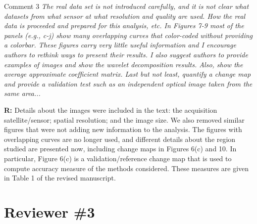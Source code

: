 \documentclass[11pt]{report}
\begin{document}

\vspace{0.3cm}


\medskip

\begin{mybox}{Comment 3}
\textit{The real data set is not introduced carefully, and it is not clear what datasets from what sensor at what resolution and
quality are used. How the real data is proceeded and prepared for this analysis, etc. In Figures 7-9 most of the panels
(e.g., c-j) show many overlapping curves that color-coded without providing a colorbar. These figures carry very little
useful information and I encourage authors to rethink ways to present their results. I also suggest authors to provide
examples of images and show the wavelet decomposition results. Also, show the average approximate coefficient
matrix. Last but not least, quantify a change map and provide a validation test such as an independent optical image
taken from the same area...}

\medskip

\textbf{R:} Details about the images were included in the text:
the acquisition satellite/sensor; spatial resolution; and the image size.
 We also removed similar figures that were not adding new information to the analysis. The figures with overlapping curves are no longer used, and different details about the region studied are presented now, including change maps in Figures 6(c) and 10. In particular, Figure 6(c) is a validation/reference change map that is used to compute accuracy measure of the methods considered. These measures are given in Table 1 of the revised manuscript.%
\end{mybox}


\medskip
\medskip
\medskip


\section*{Reviewer \#3}
\end{document}
